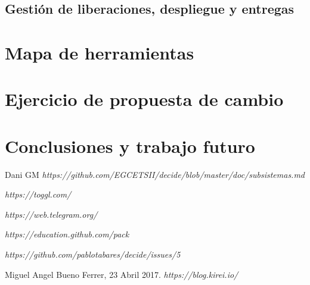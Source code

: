 \documentclass[12pt]{article}
\begin{document}
\subsection{Gestión de liberaciones, despliegue y entregas}

\section{Mapa de herramientas}
\section{Ejercicio de propuesta de cambio}
\section{Conclusiones y trabajo futuro}

\newpage	


\begin{thebibliography}{9}
Dani GM
\textit
{https://github.com/EGCETSII/decide/blob/master/doc/subsistemas.md}

\textit{https://toggl.com/}

\textit{https://web.telegram.org/}

\textit{https://education.github.com/pack}

\textit{https://github.com/pablotabares/decide/issues/5}


Miguel Angel Bueno Ferrer, 23 Abril 2017. 
\textit{https://blog.kirei.io/}
\end{thebibliography}
\end{document}
